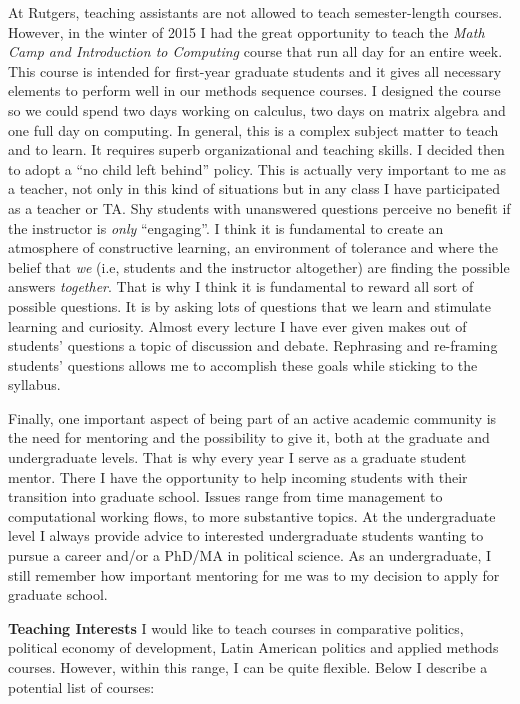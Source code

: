 \documentclass[11pt]{letter} %
\begin{document}
\begin{letter}{}
At Rutgers, teaching assistants are not allowed to teach semester-length courses. However, in the winter of 2015 I had the great opportunity to teach the \emph{Math Camp and Introduction to Computing} course that run all day for an entire week. This course is intended for first-year graduate students and it gives all necessary elements to perform well in our methods sequence courses. I designed the course so we could spend two days working on calculus, two days on matrix algebra and one full day on computing. In general, this is a complex subject matter to teach and to learn. It requires superb organizational and teaching skills. I decided then to adopt a ``no child left behind'' policy. This is actually very important to me as a teacher, not only in this kind of situations but in any class I have participated as a teacher or TA. Shy students with unanswered questions perceive no benefit if the instructor is \emph{only} ``engaging''. I think it is fundamental to create an atmosphere of constructive learning, an environment of tolerance and where the belief that \emph{we} (i.e, students and the instructor altogether) are finding the possible answers \emph{together}. That is why I think it is fundamental to reward all sort of possible questions. It is by asking lots of questions that we learn and stimulate learning and curiosity. Almost every lecture I have ever given makes out of students' questions a topic of discussion and debate. Rephrasing and re-framing students' questions allows me to accomplish these goals while sticking to the syllabus. 

Finally, one important aspect of being part of an active academic community is the need for mentoring and the possibility to give it, both at the graduate and undergraduate levels. That is why every year I serve as a graduate student mentor. There I have the opportunity to help incoming students with their transition into graduate school. Issues range from time management to computational working flows, to more substantive topics. At the undergraduate level I always provide advice to interested undergraduate students wanting to pursue a career and/or a PhD/MA in political science. As an undergraduate, I still remember how important mentoring for me was to my decision to apply for graduate school.

{\bf Teaching Interests} I would like to teach courses in comparative politics, political economy of development, Latin American politics and applied methods courses. However, within this range, I can be quite flexible. Below I describe a potential list of courses:


\end{letter}
\end{document}
